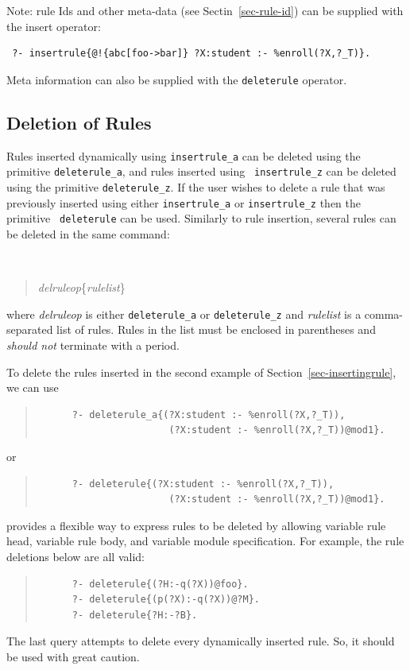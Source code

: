 \documentclass[11pt]{article}
\newcommand{\ERGO}{\mbox{\smaller{\ensuremath{\cal{E}}\smaller{{\sc{RGO}}}}}\xspace}
\newcommand{\FLSYSTEM}{\ERGO}
\begin{document}
Note: rule Ids and other meta-data (see Sectin~\ref{sec-rule-id})
can be supplied with the insert operator: 
\begin{verbatim}
 ?- insertrule{@!{abc[foo->bar]} ?X:student :- %enroll(?X,?_T)}.
\end{verbatim}
Meta information can also be supplied with the \texttt{deleterule}
operator. 


\subsection{Deletion of Rules}
\label{sec-deletingrule}

Rules inserted dynamically using {\tt insertrule\_a} can be deleted using
the primitive {\tt deleterule\_a}, and rules inserted using {\tt
  insertrule\_z} can be deleted using the primitive {\tt deleterule\_z}. If
the user wishes to delete a rule that was previously inserted using either
{\tt insertrule\_a} or {\tt insertrule\_z} then the primitive {\tt
  deleterule} can be used. Similarly to rule insertion, several rules can be
deleted in the same command:
{\tt
\begin{quote}
\emph{delruleop}\{\emph{rulelist}\}
\end{quote}
}
\noindent
where \emph{delruleop} is either {\tt deleterule\_a} or {\tt deleterule\_z}
and \emph{rulelist} is a comma-separated list of rules. Rules in the list
must be enclosed in parentheses and \emph{should not} terminate with a
period.

To delete the rules inserted in the second example of
Section~\ref{sec-insertingrule}, we can use
\begin{quote}
\begin{verbatim}
      ?- deleterule_a{(?X:student :- %enroll(?X,?_T)),
                       (?X:student :- %enroll(?X,?_T))@mod1}.
\end{verbatim}
\end{quote}
or
\begin{quote}
\begin{verbatim}
      ?- deleterule{(?X:student :- %enroll(?X,?_T)),
                       (?X:student :- %enroll(?X,?_T))@mod1}.
\end{verbatim}
\end{quote}

\FLSYSTEM provides a flexible way to express rules to be deleted by
allowing variable rule head, variable rule body, and variable module
specification. For example, the rule deletions below are all valid:
\begin{quote}
\begin{verbatim}
      ?- deleterule{(?H:-q(?X))@foo}.
      ?- deleterule{(p(?X):-q(?X))@?M}.
      ?- deleterule{?H:-?B}.
\end{verbatim}
\end{quote}
The last query attempts to delete every dynamically inserted rule. So, it
should be used with great caution.
\end{document}
